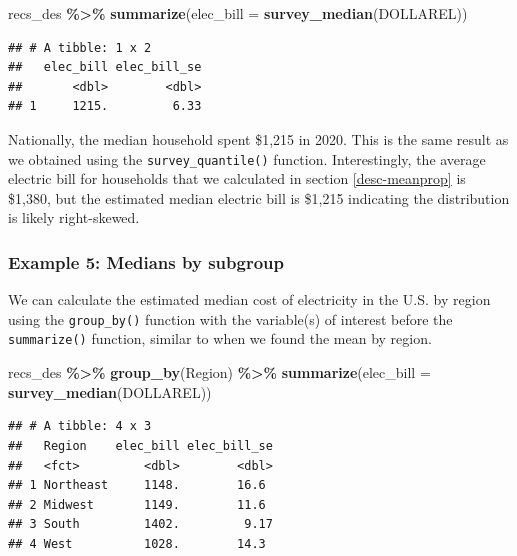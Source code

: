 \documentclass[
]{krantz}
\makeatletter
\newenvironment{Shaded}{\begin{snugshade}}{\end{snugshade}}
\newcommand{\AttributeTok}[1]{\textcolor[rgb]{0.27,0.27,0.27}{#1}}
\newcommand{\FunctionTok}[1]{\textcolor[rgb]{0.27,0.27,0.27}{\textbf{#1}}}
\newcommand{\NormalTok}[1]{#1}
\newcommand{\SpecialCharTok}[1]{\textcolor[rgb]{0.43,0.43,0.43}{\textbf{#1}}}
\newenvironment{kframe}{%
\medskip{}
\setlength{\fboxsep}{.8em}
 \def\at@end@of@kframe{}%
 \ifinner\ifhmode%
  \def\at@end@of@kframe{\end{minipage}}%
  \begin{minipage}{\columnwidth}%
 \fi\fi%
 \def\FrameCommand##1{\hskip\@totalleftmargin \hskip-\fboxsep
 \colorbox{shadecolor}{##1}\hskip-\fboxsep
     \hskip-\linewidth \hskip-\@totalleftmargin \hskip\columnwidth}%
 \MakeFramed {\advance\hsize-\width
   \@totalleftmargin\z@ \linewidth\hsize
   \@setminipage}}%
 {\par\unskip\endMakeFramed%
 \at@end@of@kframe}
\renewenvironment{Shaded}{\begin{kframe}}{\end{kframe}}
\makeatother
\begin{document}
\begin{Shaded}
\begin{Highlighting}[]
\NormalTok{recs\_des }\SpecialCharTok{\%\textgreater{}\%}
  \FunctionTok{summarize}\NormalTok{(}\AttributeTok{elec\_bill =} \FunctionTok{survey\_median}\NormalTok{(DOLLAREL))}
\end{Highlighting}
\end{Shaded}

\begin{verbatim}
## # A tibble: 1 x 2
##   elec_bill elec_bill_se
##       <dbl>        <dbl>
## 1     1215.         6.33
\end{verbatim}

Nationally, the median household spent \$1,215 in 2020. This is the same result as we obtained using the \texttt{survey\_quantile()} function. Interestingly, the average electric bill for households that we calculated in section \ref{desc-meanprop} is \$1,380, but the estimated median electric bill is \$1,215 indicating the distribution is likely right-skewed.

\hypertarget{example-5-medians-by-subgroup}{%
\subsubsection*{Example 5: Medians by subgroup}\label{example-5-medians-by-subgroup}}


We can calculate the estimated median cost of electricity in the U.S. by region using the \texttt{group\_by()} function with the variable(s) of interest before the \texttt{summarize()} function, similar to when we found the mean by region.

\begin{Shaded}
\begin{Highlighting}[]
\NormalTok{recs\_des }\SpecialCharTok{\%\textgreater{}\%}
  \FunctionTok{group\_by}\NormalTok{(Region) }\SpecialCharTok{\%\textgreater{}\%}
  \FunctionTok{summarize}\NormalTok{(}\AttributeTok{elec\_bill =} \FunctionTok{survey\_median}\NormalTok{(DOLLAREL))}
\end{Highlighting}
\end{Shaded}

\begin{verbatim}
## # A tibble: 4 x 3
##   Region    elec_bill elec_bill_se
##   <fct>         <dbl>        <dbl>
## 1 Northeast     1148.        16.6 
## 2 Midwest       1149.        11.6 
## 3 South         1402.         9.17
## 4 West          1028.        14.3
\end{verbatim}
\end{document}
